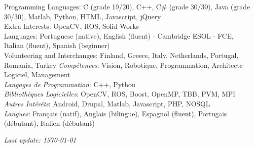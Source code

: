 \documentclass{article}
\begin{document}
\begin{llist}
{}

{
Programming Languages: C (grade 19/20), C++, C\# (grade 30/30), Java (grade 30/30), Matlab, Python, HTML, Javascript, jQuery\\
Extra Interests: OpenCV, ROS, Solid Works\\

Languages: Portuguese (native), English (fluent) - Cambridge ESOL - FCE, Italian (fluent), Spanish (beginner)\\
Volunteering and Interchanges: Finland, Greece, Italy, Netherlands, Portugal, Romania, Turkey
}
{
{\em Comp\'{e}tences}: Vision, Robotique, Programmation, Architecte Logiciel, Management\\
{\em Langages de Programmation}: C++, Python\\
{\em Biblioth\`{e}ques Logicielles}: OpenCV, ROS, Boost, OpenMP, TBB, PVM, MPI \\
{\em Autres Int\'{e}r\^{e}ts}: Android, Drupal, Matlab, Javascript, PHP, NOSQL \\
{\em Langues}: Fran\c{c}ais (natif), Anglais (bilingue), Espagnol (fluent), Portugais (d\'{e}butant), Italien
(d\'{e}butant)
}




\end{llist}

{\em Last update: \today}
\end{document}
